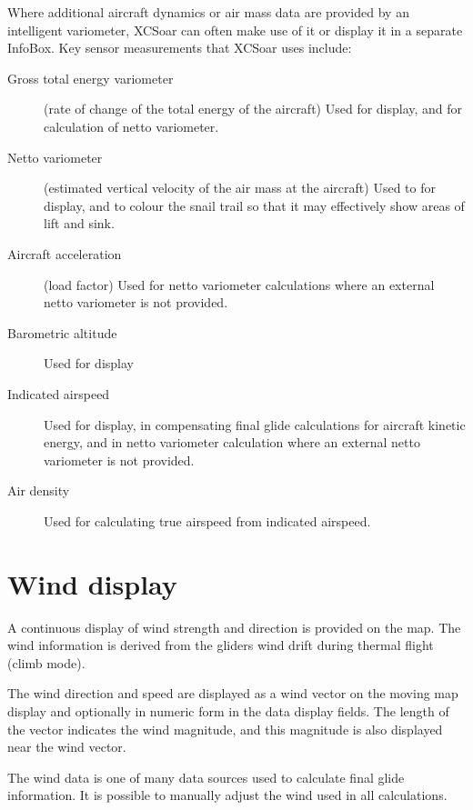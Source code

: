 Where additional aircraft dynamics or air mass data are provided by an
intelligent variometer, XCSoar can often make use of it or display it
in a separate InfoBox.  Key sensor measurements that XCSoar uses include:
\begin{description}
\item[Gross total energy variometer] (rate of change of the total energy of
 the aircraft)  Used for display, and for calculation of netto variometer.
\item[Netto variometer] (estimated vertical velocity of the air mass at
 the aircraft)  Used to for display, and to colour the snail trail
 so that it may effectively show areas of lift and sink.
\item[Aircraft acceleration] (load factor)  Used for netto variometer
  calculations where an external netto variometer is not provided.
\item[Barometric altitude] Used for display
\item[Indicated airspeed] Used for display, in compensating final glide
  calculations for aircraft kinetic energy, and in netto variometer
  calculation where an external netto variometer is not provided.
\item[Air density] Used for calculating true airspeed from indicated
  airspeed.
\end{description}

\section{Wind display}

A continuous display of wind strength and direction is provided on the
map.  The wind information is derived from the gliders wind drift
during thermal flight (climb mode).

The wind direction and speed are displayed as a wind vector on the
moving map display and optionally in numeric form in the data display
fields.  The length of the vector indicates the wind magnitude, and
this magnitude is also displayed near the wind vector.

The wind data is one of many data sources used to calculate final
glide information.  It is possible to manually adjust the wind used in
all calculations.

